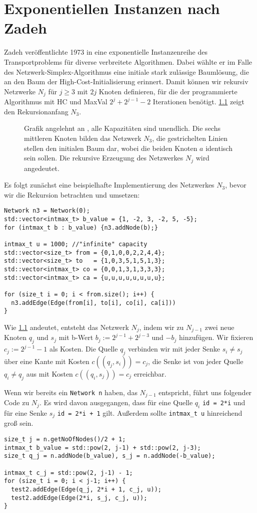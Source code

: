 \chapter{Exponentiellen Instanzen nach Zadeh}\label{ch:lit}
Zadeh veröffentlichte 1973 in \cite{Exponential} eine exponentielle Instanzenreihe des Transportproblems für diverse verbreitete Algorithmen. Dabei wählte er im Falle des Netzwerk-Simplex-Algorithmus eine initiale stark zulässige Baumlösung, die an den Baum der High-Cost-Initialisierung erinnert. Damit können wir rekursiv Netzwerke $N_j$ für $j\geq 3$ mit $2j$ Knoten definieren, für die der programmierte Algorithmus mit HC und MaxVal $2^j + 2^{j-1} - 2$ Iterationen benötigt. \cref{fig:N3} zeigt den Rekursionanfang $N_3$.
\begin{figure}[!ht]\centering
    
    \caption{Grafik angelehnt an \cite[S. 261]{Exponential}, alle Kapazitäten sind unendlich. Die sechs mittleren Knoten bilden das Netzwerk $N_3$, die gestrichelten Linien stellen den initialen Baum dar, wobei die beiden Knoten $a$ identisch sein sollen. Die rekursive Erzeugung des Netzwerkes $N_j$ wird angedeutet.}
    \label{fig:N3}
\end{figure}

Es folgt zunächst eine beispielhafte Implementierung des Netzwerkes $N_3$, bevor wir die Rekursion betrachten und umsetzen:

\begin{lstlisting}
Network n3 = Network(0);
std::vector<intmax_t> b_value = {1, -2, 3, -2, 5, -5};
for (intmax_t b : b_value) {n3.addNode(b);}

intmax_t u = 1000; //"infinite" capacity
std::vector<size_t> from = {0,1,0,0,2,2,4,4};
std::vector<size_t> to   = {1,0,3,5,1,5,1,3};
std::vector<intmax_t> co = {0,0,1,3,1,3,3,3};
std::vector<intmax_t> ca = {u,u,u,u,u,u,u,u};

for (size_t i = 0; i < from.size(); i++) {
  n3.addEdge(Edge(from[i], to[i], co[i], ca[i]))
}
\end{lstlisting}

Wie \cref{fig:N3} andeutet, entsteht das Netzwerk $N_j$, indem wir zu $N_{j-1}$ zwei neue Knoten $q_j$ und $s_j$ mit b-Wert $b_j:=2^{j-1} + 2^{j-3}$ und $-b_j$ hinzufügen. Wir fixieren $c_j:=2^{j-1}-1$ als Kosten. Die Quelle $q_j$ verbinden wir mit jeder Senke $s_i\neq s_j$ über eine Kante mit Kosten $c((q_j,s_i))=c_j$, die Senke ist von jeder Quelle $q_i\neq q_j$ aus mit Kosten $c((q_i,s_j))=c_j$ erreichbar.

Wenn wir bereits ein \lstinline|Network n| haben, das $N_{j-1}$ entspricht, führt uns folgender Code zu $N_{j}$. Es wird davon ausgegangen, dass für eine Quelle $q_i$ \lstinline|id = 2*i| und für eine Senke $s_j$ \lstinline|id = 2*i + 1| gilt. Außerdem sollte \lstinline|intmax_t u| hinreichend groß sein.

\begin{lstlisting}
size_t j = n.getNoOfNodes()/2 + 1;
intmax_t b_value = std::pow(2, j-1) + std::pow(2, j-3);
size_t q_j = n.addNode(b_value), s_j = n.addNode(-b_value);

intmax_t c_j = std::pow(2, j-1) - 1;
for (size_t i = 0; i < j-1; i++) {
  test2.addEdge(Edge(q_j, 2*i + 1, c_j, u));
  test2.addEdge(Edge(2*i, s_j, c_j, u));
}
\end{lstlisting}